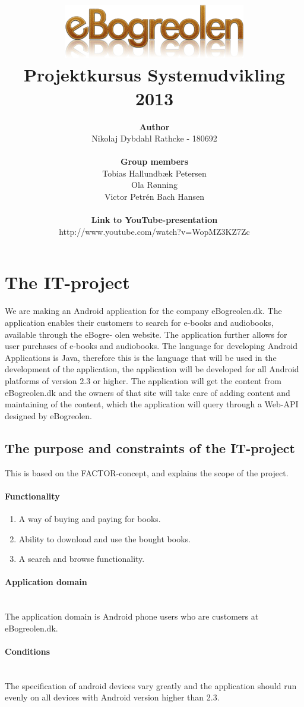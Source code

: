 \documentclass[12pt]{article}
\title{\includegraphics[scale=1]{store_logo}\\Projektkursus Systemudvikling 2013}
\author{\textbf{Author}\\ Nikolaj Dybdahl Rathcke - 180692\\\\
\textbf{Group members}\\ Tobias Hallundbæk Petersen\\ Ola Rønning\\ Victor Petrén Bach Hansen\\\\
\textbf{Link to YouTube-presentation}\\ http://www.youtube.com/watch?v=WopMZ3KZ7Zc}
\begin{document}
\maketitle
\newpage
\tableofcontents
\newpage

\section{The IT-project}
We are making an Android application for the company eBogreolen.dk. The application
enables their customers to search for e-books and audiobooks, available through the eBogre-
olen website. The application further allows for user purchases of e-books and audiobooks.
The language for developing Android Applications is Java, therefore this is the language
that will be used in the development of the application, the application will be developed
for all Android platforms of version 2.3 or higher. The application will get the content from
eBogreolen.dk and the owners of that site will take care of adding content and maintaining
of the content, which the application will query through a Web-API designed by eBogreolen.
\subsection{The purpose and constraints of the IT-project}
This is based on the FACTOR-concept, and explains the scope of the project.
\paragraph{Functionality}
\begin{enumerate}
\item A way of buying and paying for books.
\item Ability to download and use the bought books.
\item A search and browse functionality.
\end{enumerate}

\paragraph{Application domain}$ $\\
The application domain is Android phone users who are customers at eBogreolen.dk.

\paragraph{Conditions}$ $\\
The specification of android devices vary greatly and the application should run evenly on all devices with Android version higher than 2.3.
\end{document}
